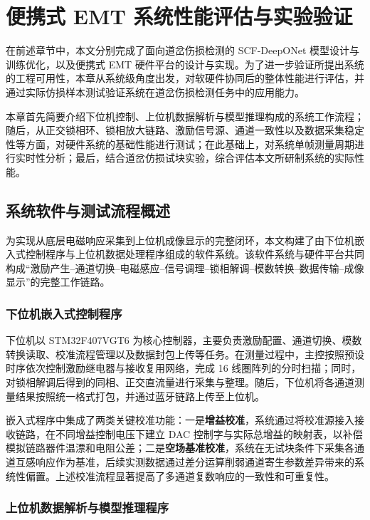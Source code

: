 \chapter{便携式 EMT 系统性能评估与实验验证}

在前述章节中，本文分别完成了面向道岔伤损检测的 SCF-DeepONet 模型设计与训练优化，以及便携式 EMT 硬件平台的设计与实现。为了进一步验证所提出系统的工程可用性，本章从系统级角度出发，对软硬件协同后的整体性能进行评估，并通过实际仿损样本测试验证系统在道岔伤损检测任务中的应用能力。

本章首先简要介绍下位机控制、上位机数据解析与模型推理构成的系统工作流程；随后，从正交锁相环、锁相放大链路、激励信号源、通道一致性以及数据采集稳定性等方面，对硬件系统的基础性能进行测试；在此基础上，对系统单帧测量周期进行实时性分析；最后，结合道岔仿损试块实验，综合评估本文所研制系统的实际性能。

\section{系统软件与测试流程概述}

为实现从底层电磁响应采集到上位机成像显示的完整闭环，本文构建了由下位机嵌入式控制程序与上位机数据处理程序组成的软件系统。该软件系统与硬件平台共同构成``激励产生--通道切换--电磁感应--信号调理--锁相解调--模数转换--数据传输--成像显示''的完整工作链路。

\subsection{下位机嵌入式控制程序}

下位机以 STM32F407VGT6 为核心控制器，主要负责激励配置、通道切换、模数转换读取、校准流程管理以及数据封包上传等任务。在测量过程中，主控按照预设时序依次控制激励继电器与接收复用网络，完成 16 线圈阵列的分时扫描；同时，对锁相解调后得到的同相、正交直流量进行采集与整理。随后，下位机将各通道测量结果按照统一格式打包，并通过蓝牙链路上传至上位机。

嵌入式程序中集成了两类关键校准功能：一是\textbf{增益校准}，系统通过将校准源接入接收链路，在不同增益控制电压下建立 DAC 控制字与实际总增益的映射表，以补偿模拟链路器件温漂和电阻公差；二是\textbf{空场基准校准}，系统在无试块条件下采集各通道互感响应作为基准，后续实测数据通过差分运算削弱通道寄生参数差异带来的系统性偏置。上述校准流程显著提高了多通道复数响应的一致性和可重复性。

\subsection{上位机数据解析与模型推理程序}

